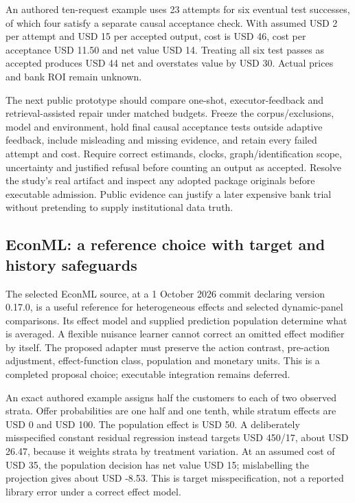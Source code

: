 An authored ten-request example uses 23 attempts for six eventual test
successes, of which four satisfy a separate causal acceptance check.
With assumed USD 2 per attempt and USD 15 per accepted output, cost is
USD 46, cost per acceptance USD 11.50 and net value USD 14. Treating all
six test passes as accepted produces USD 44 net and overstates value by
USD 30. Actual prices and bank ROI remain unknown.
\citep{exec19_retrieval_repair_reference}

The next public prototype should compare one-shot, executor-feedback and
retrieval-assisted repair under matched budgets. Freeze the
corpus/exclusions, model and environment, hold final causal acceptance
tests outside adaptive feedback, include misleading and missing
evidence, and retain every failed attempt and cost. Require correct
estimands, clocks, graph/identification scope, uncertainty and justified
refusal before counting an output as accepted. Resolve the study's real
artifact and inspect any adopted package originals before executable
admission. Public evidence can justify a later expensive bank trial
without pretending to supply institutional data truth.
\citep{exec19_rag_survey,exec19_selfcorrection_study,exec19_retrieval_repair_reference}

\hypertarget{econml-a-reference-choice-with-target-and-history-safeguards}{%
\subsection{EconML: a reference choice with target and history
safeguards}\label{econml-a-reference-choice-with-target-and-history-safeguards}}

The selected EconML source, at a 1 October 2026 commit declaring version
0.17.0, is a useful reference for heterogeneous effects and selected
dynamic-panel comparisons. Its effect model and supplied prediction
population determine what is averaged. A flexible nuisance learner
cannot correct an omitted effect modifier by itself. The proposed
adapter must preserve the action contrast, pre-action adjustment,
effect-function class, population and monetary units. This is a
completed proposal choice; executable integration remains deferred.
\citep{exec19_econml_source}

An exact authored example assigns half the customers to each of two
observed strata. Offer probabilities are one half and one tenth, while
stratum effects are USD 0 and USD 100. The population effect is USD 50.
A deliberately misspecified constant residual regression instead targets
USD 450/17, about USD 26.47, because it weights strata by treatment
variation. At an assumed cost of USD 35, the population decision has net
value USD 15; mislabelling the projection gives about USD -8.53. This is
target misspecification, not a reported library error under a correct
effect model. \citep{exec19_econml_reference}

